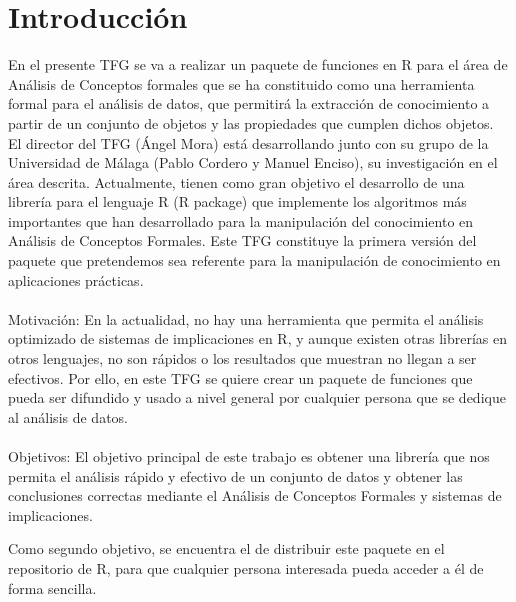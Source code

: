 \section{Introducci\'on}

En el presente TFG se va a realizar un paquete de funciones en 
R para el \'area de An\'alisis de Conceptos formales que se ha 
constituido como una herramienta formal para el an\'alisis de datos, 
que permitir\'a la extracci\'on de conocimiento a partir de un 
conjunto de objetos y las propiedades que cumplen dichos objetos.
\\
El director del TFG (\'Angel Mora) est\'a desarrollando junto 
con su grupo de la Universidad de M\'alaga (Pablo Cordero y Manuel 
Enciso), su investigaci\'on en el \'area descrita. Actualmente, 
tienen como gran objetivo el desarrollo de una librer\'ia para el 
lenguaje R (R package) que implemente los algoritmos m\'as 
importantes que han desarrollado para la manipulaci\'on del 
conocimiento en An\'alisis de Conceptos Formales. Este TFG 
constituye la primera versi\'on del paquete que pretendemos sea 
referente para la manipulaci\'on de conocimiento en aplicaciones 
pr\'acticas.
\\
\\
Motivaci\'on:
En la actualidad, no hay una herramienta que permita el an\'alisis 
optimizado de sistemas de implicaciones en R, y aunque existen otras 
librer\'ias en otros lenguajes, no son r\'apidos o los resultados que 
muestran no llegan a ser efectivos.
Por ello, en este TFG se quiere crear un paquete de funciones que pueda 
ser difundido y usado a nivel general por cualquier persona que se dedique 
al an\'alisis de datos.
\\
\\
Objetivos:
El objetivo principal de este trabajo es obtener una librer\'ia que 
nos permita el an\'alisis r\'apido y efectivo de un conjunto de datos 
y obtener las conclusiones correctas mediante el An\'alisis de Conceptos 
Formales y sistemas de implicaciones.

Como segundo objetivo, se encuentra el de distribuir este paquete en el repositorio 
de R, para que cualquier persona interesada pueda acceder a \'el de forma sencilla.
\\
\\


\newpage
\thispagestyle{empty}
\mbox{}

\newpage